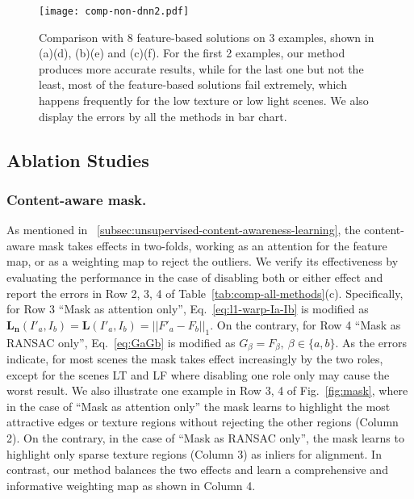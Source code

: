 \documentclass[runningheads]{llncs}
\begin{document}
\begin{figure}[t]
  \centering
  \texttt{[image: comp-non-dnn2.pdf]}
  \caption{Comparison with 8 feature-based solutions on 3 examples, shown in (a)(d), (b)(e) and (c)(f). For the first 2 examples, our method produces more accurate results, while for the last one but not the least, most of the feature-based solutions fail extremely, which happens frequently for the low texture or low light scenes. We also display the errors by all the methods in bar chart.}\label{fig:feature_failure}
\end{figure}




\subsection{Ablation Studies}

\subsubsection{Content-aware mask.}\label{subsec:ablation-content-aware-mask}
As mentioned in \secname~\ref{subsec:unsupervised-content-awareness-learning}, the content-aware mask takes effects in two-folds, working as an attention for the feature map, or as a weighting map to reject the outliers.
We verify its effectiveness by evaluating the performance in the case of disabling both or either effect and report the errors in Row 2, 3, 4 of Table~\ref{tab:comp-all-methods}(c).
Specifically, for Row 3 ``Mask as attention only'', Eq.~\ref{eq:l1-warp-Ia-Ib} is modified as $\mathbf{L_n}(I'_a, I_b) = \mathbf{L}(I'_a, I_b) = ||F'_a - F_b||_1$. On the contrary, for Row 4 ``Mask as RANSAC only'', Eq.~\ref{eq:GaGb} is modified as $G_\beta = F_\beta, ~\beta \in \{a,b\}$. As the errors indicate, for most scenes the mask takes effect increasingly by the two roles, except for the scenes LT and LF where disabling one role only may cause the worst result. We also illustrate one example in Row 3, 4 of Fig.~\ref{fig:mask}, where in the case of ``Mask as attention only'' the mask learns to highlight the most attractive edges or texture regions without rejecting the other regions (Column 2). On the contrary, in the case of ``Mask as RANSAC only'', the mask learns to highlight only sparse texture regions (Column 3) as inliers for alignment. In contrast, our method balances the two effects and learn a comprehensive and informative weighting map as shown in Column 4. 
\end{document}
